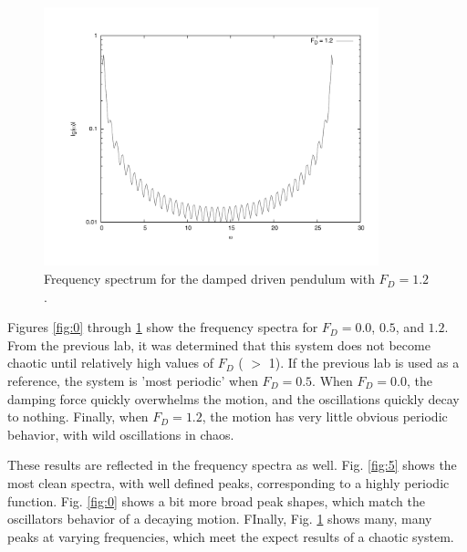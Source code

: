 \documentclass[12pt]{article}
\begin{document}
\begin{figure}[!h]
\centering
\includegraphics[width =120 mm, height = 75mm]{ddp_12.pdf}
\caption{Frequency spectrum for the damped driven pendulum with $F_D = 1.2$.}
\label{fig:12}
\end{figure}

Figures \ref{fig:0} through \ref{fig:12} show the frequency spectra for $F_D = 0.0$, $0.5$, and $1.2$.  From the previous lab, it was determined that this system does not become chaotic until relatively high values of $F_D$ ( $>$ 1).  If the previous lab is used as a reference, the system is 'most periodic' when $F_D = 0.5$.  When $F_D = 0.0$, the damping force quickly overwhelms the motion, and the oscillations quickly decay to nothing.  Finally, when $F_D = 1.2$, the motion has very little obvious periodic behavior, with wild oscillations in chaos.  

These results are reflected in the frequency spectra as well.  Fig. \ref{fig:5} shows the most clean spectra, with well defined peaks, corresponding to a highly periodic function.  Fig. \ref{fig:0} shows a bit more broad peak shapes, which match the oscillators behavior of a decaying motion.  FInally, Fig. \ref{fig:12} shows many, many peaks at varying frequencies, which meet the expect results of a chaotic system.
\end{document}

